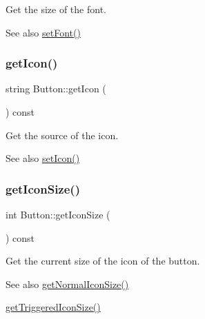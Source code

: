 Get the size of the font. 

\begin{DoxySeeAlso}{See also}
\mbox{\hyperlink{class_button_ae899f37b125b8514af8153b694dad678}{set\+Font()}} 
\end{DoxySeeAlso}
\mbox{\label{class_button_a17552602296d94d95e3cc91bce3f4aad}} 
\subsubsection{\texorpdfstring{get\+Icon()}{getIcon()}}
{\footnotesize\ttfamily string Button\+::get\+Icon (\begin{DoxyParamCaption}{ }\end{DoxyParamCaption}) const\hspace{0.3cm}{\ttfamily [inline]}}



Get the source of the icon. 

\begin{DoxySeeAlso}{See also}
\mbox{\hyperlink{class_button_ac6bc8c6df116a4e24b32cc5ce9903704}{set\+Icon()}} 
\end{DoxySeeAlso}
\mbox{\label{class_button_a3c2aae2875eb8879dd7d623e3cfd6710}} 
\subsubsection{\texorpdfstring{get\+Icon\+Size()}{getIconSize()}}
{\footnotesize\ttfamily int Button\+::get\+Icon\+Size (\begin{DoxyParamCaption}{ }\end{DoxyParamCaption}) const\hspace{0.3cm}{\ttfamily [inline]}}



Get the current size of the icon of the button. 

\begin{DoxySeeAlso}{See also}
\mbox{\hyperlink{class_button_a8524ec4a0e9de07413fe445104654a90}{get\+Normal\+Icon\+Size()}} 

\mbox{\hyperlink{class_button_a317bc7f7c5d871d60515aa91a434f645}{get\+Triggered\+Icon\+Size()}} 
\end{DoxySeeAlso}
\mbox{\label{class_button_aebcf5fd7a9807c0f3416546dba5c37bf}} 
